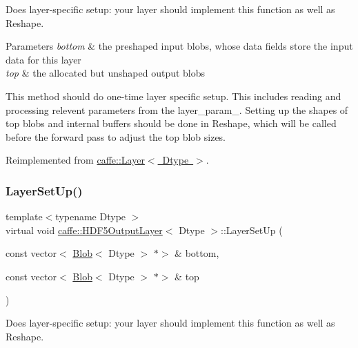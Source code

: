 Does layer-\/specific setup\+: your layer should implement this function as well as Reshape. 


\begin{DoxyParams}{Parameters}
{\em bottom} & the preshaped input blobs, whose data fields store the input data for this layer \\
\hline
{\em top} & the allocated but unshaped output blobs\\
\hline
\end{DoxyParams}
This method should do one-\/time layer specific setup. This includes reading and processing relevent parameters from the {\ttfamily layer\+\_\+param\+\_\+}. Setting up the shapes of top blobs and internal buffers should be done in {\ttfamily Reshape}, which will be called before the forward pass to adjust the top blob sizes. 

Reimplemented from \mbox{\hyperlink{classcaffe_1_1_layer_a481323a3e0972c682787f2137468c29f}{caffe\+::\+Layer$<$ Dtype $>$}}.

\mbox{\label{classcaffe_1_1_h_d_f5_output_layer_afb7ab27b33e5eaec6c50893f28748c14}} 
\subsubsection{\texorpdfstring{Layer\+Set\+Up()}{LayerSetUp()}\hspace{0.1cm}{\footnotesize\ttfamily [2/2]}}
{\footnotesize\ttfamily template$<$typename Dtype $>$ \\
virtual void \mbox{\hyperlink{classcaffe_1_1_h_d_f5_output_layer}{caffe\+::\+H\+D\+F5\+Output\+Layer}}$<$ Dtype $>$\+::Layer\+Set\+Up (\begin{DoxyParamCaption}\item[{const vector$<$ \mbox{\hyperlink{classcaffe_1_1_blob}{Blob}}$<$ Dtype $>$ $\ast$$>$ \&}]{bottom,  }\item[{const vector$<$ \mbox{\hyperlink{classcaffe_1_1_blob}{Blob}}$<$ Dtype $>$ $\ast$$>$ \&}]{top }\end{DoxyParamCaption})\hspace{0.3cm}{\ttfamily [virtual]}}



Does layer-\/specific setup\+: your layer should implement this function as well as Reshape. 


